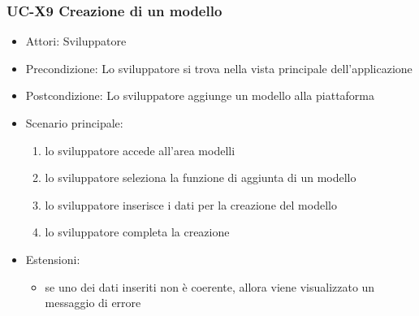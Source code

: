 	\subsubsection{UC-X9 Creazione di un modello}
		\begin{itemize}
			\item Attori: Sviluppatore
			\item Precondizione: Lo sviluppatore si trova nella vista principale dell'applicazione
			\item Postcondizione: Lo sviluppatore aggiunge un modello alla piattaforma
			\item Scenario principale:
			\begin{enumerate}
				\item lo sviluppatore accede all'area modelli
				\item lo sviluppatore seleziona la funzione di aggiunta di un modello
				\item lo sviluppatore inserisce i dati per la creazione del modello
				\item lo sviluppatore completa la creazione
			\end{enumerate}
			\item Estensioni:
				\begin{itemize}
					\item se uno dei dati inseriti non è coerente, allora viene visualizzato un messaggio di errore
				\end{itemize}
		\end{itemize}
